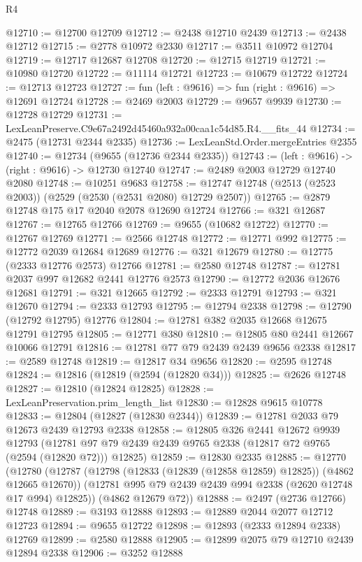\begin{lexlean}{R4}
\begin{coremodule}
@12710 := @12700 @12709
@12712 := @2438 @12710 @2439
@12713 := @2438 @12712
@12715 := @2778 @10972 @2330
@12717 := @3511 @10972 @12704
@12719 := @12717 @12687 @12708
@12720 := @12715 @12719
@12721 := @10980 @12720
@12722 := @11114 @12721
@12723 := @10679 @12722
@12724 := @12713 @12723
@12727 := fun (left : @9616) => fun (right : @9616) => @12691 @12724
@12728 := @2469 @2003
@12729 := @9657 @9939
@12730 := @12728 @12729
@12731 := LexLeanPreserve.C9e67a2492d45460a932a00caa1c54d85.R4.__fits_44
@12734 := @2475 (@12731 @2344 @2335)
@12736 := LexLeanStd.Order.mergeEntries @2355
@12740 := @12734 (@9655 (@12736 @2344 @2335))
@12743 := (left : @9616) -> (right : @9616) -> @12730 @12740
@12747 := @2489 @2003 @12729 @12740 @2080
@12748 := @10251 @9683
@12758 := @12747 @12748 (@2513 (@2523 @2003)) (@2529 (@2530 (@2531 @2080) @12729 @2507))
@12765 := @2879 @12748 @175 @17 @2040 @2078 @12690 @12724
@12766 := @321 @12687
@12767 := @12765 @12766
@12769 := @9655 (@10682 @12722)
@12770 := @12767 @12769
@12771 := @2566 @12748
@12772 := @12771 @992
@12775 := @12772 @2039 @12684 @12689
@12776 := @321 @12679
@12780 := @12775 (@2333 @12776 @2573) @12766
@12781 := @2580 @12748
@12787 := @12781 @2037 @997 @12682 @2441 @12776 @2573
@12790 := @12772 @2036 @12676 @12681
@12791 := @321 @12665
@12792 := @2333 @12791
@12793 := @321 @12670
@12794 := @2333 @12793
@12795 := @12794 @2338
@12798 := @12790 (@12792 @12795) @12776
@12804 := @12781 @382 @2035 @12668 @12675 @12791 @12795
@12805 := @12771 @380
@12810 := @12805 @80 @2441 @12667 @10066 @12791
@12816 := @12781 @77 @79 @2439 @2439 @9656 @2338
@12817 := @2589 @12748
@12819 := @12817 @34 @9656
@12820 := @2595 @12748
@12824 := @12816 (@12819 (@2594 (@12820 @34)))
@12825 := @2626 @12748
@12827 := @12810 (@12824 @12825)
@12828 := LexLeanPreservation.prim_length_list
@12830 := @12828 @9615 @10778
@12833 := @12804 (@12827 (@12830 @2344))
@12839 := @12781 @2033 @79 @12673 @2439 @12793 @2338
@12858 := @12805
    @326
    @2441
    @12672
    @9939
    @12793
    (@12781 @97 @79 @2439 @2439 @9765 @2338 (@12817 @72 @9765 (@2594 (@12820 @72))) @12825)
@12859 := @12830 @2335
@12885 := @12770
    (@12780
      (@12787
        (@12798 (@12833 (@12839 (@12858 @12859) @12825)) (@4862 @12665 @12670))
        (@12781 @995 @79 @2439 @2439 @994 @2338 (@2620 @12748 @17 @994) @12825))
      (@4862 @12679 @72))
@12888 := @2497 (@2736 @12766) @12748
@12889 := @3193 @12888
@12893 := @12889 @2044 @2077 @12712 @12723
@12894 := @9655 @12722
@12898 := @12893 (@2333 @12894 @2338) @12769
@12899 := @2580 @12888
@12905 := @12899 @2075 @79 @12710 @2439 @12894 @2338
@12906 := @3252 @12888

\end{coremodule}
\end{lexlean}

